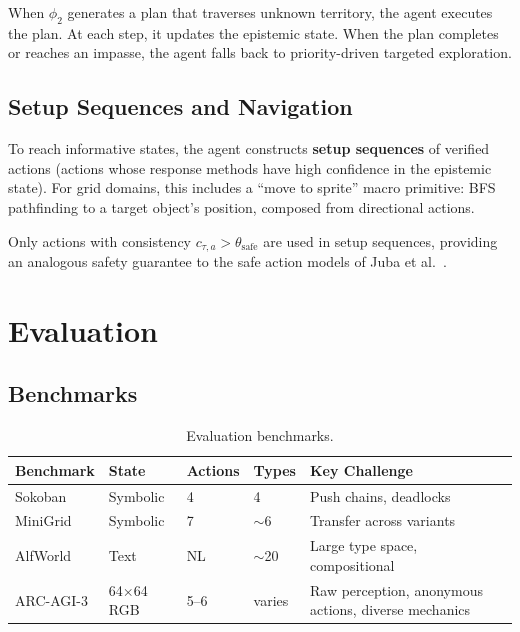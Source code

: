 \documentclass{article}
\begin{document}
When $\phi_2$ generates a plan that traverses unknown territory, the agent
executes the plan.  At each step, it updates the epistemic state.  When the
plan completes or reaches an impasse, the agent falls back to
priority-driven targeted exploration.

\subsection{Setup Sequences and Navigation}
\label{sec:setup}

To reach informative states, the agent constructs \textbf{setup sequences}
of verified actions (actions whose response methods have high confidence in
the epistemic state).  For grid domains, this includes a
``move to sprite'' macro primitive: BFS pathfinding to a target object's
position, composed from directional actions.

Only actions with consistency $c_{\tau,a} > \theta_{\text{safe}}$ are used
in setup sequences, providing an analogous safety guarantee to the safe
action models of Juba et al.~\cite{juba2021safe}.



\section{Evaluation}
\label{sec:evaluation}

\subsection{Benchmarks}
\label{sec:benchmarks}

\begin{table}[h]
\centering
\caption{Evaluation benchmarks.}
\label{tab:benchmarks}
\begin{tabular}{@{}llllp{4cm}@{}}
\toprule
\textbf{Benchmark} & \textbf{State} & \textbf{Actions} & \textbf{Types} &
\textbf{Key Challenge} \\
\midrule
Sokoban & Symbolic & 4 & 4 & Push chains, deadlocks \\
MiniGrid & Symbolic & 7 & $\sim$6 & Transfer across variants \\
AlfWorld & Text & NL & $\sim$20 & Large type space, compositional \\
ARC-AGI-3 & 64$\times$64 RGB & 5--6 & varies & Raw perception, anonymous
actions, diverse mechanics \\
\bottomrule
\end{tabular}
\end{table}
\end{document}
